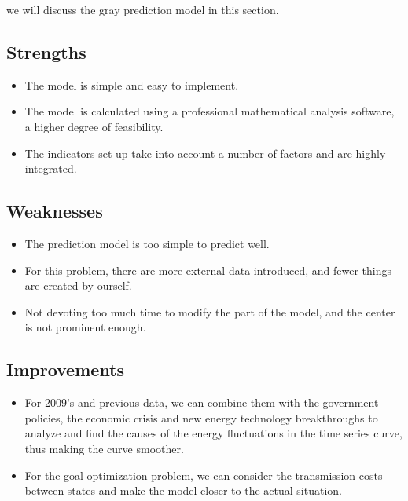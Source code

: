 \documentclass{mcmthesis}
\newcommand{\rmnum}[1]{\romannumeral #1}
\begin{document}
we will discuss the gray prediction model in this section.
\subsection{Strengths}
\begin{itemize}
  \item The model is simple and easy to implement.
  \item The model is calculated using a professional mathematical analysis software, a higher degree of feasibility.
  \item The indicators set up take into account a number of factors and are highly integrated.
\end{itemize}
\subsection{Weaknesses}
\begin{itemize}
  \item The prediction model is too simple to predict well.
  \item For this problem, there are more external data introduced, and fewer things are created by ourself.
  \item Not devoting too much time to modify the part of the model, and the center is not prominent enough.
\end{itemize}
\subsection{Improvements}
\begin{itemize}
  \item For 2009's and previous data, we can combine them with the government policies, the economic crisis and new energy technology breakthroughs to analyze and find the causes of the energy fluctuations in the time series curve, thus making the curve smoother.
  \item For the goal optimization problem, we can consider the transmission costs between states and make the model closer to the actual situation.
\end{itemize}

\newpage



\end{document}
